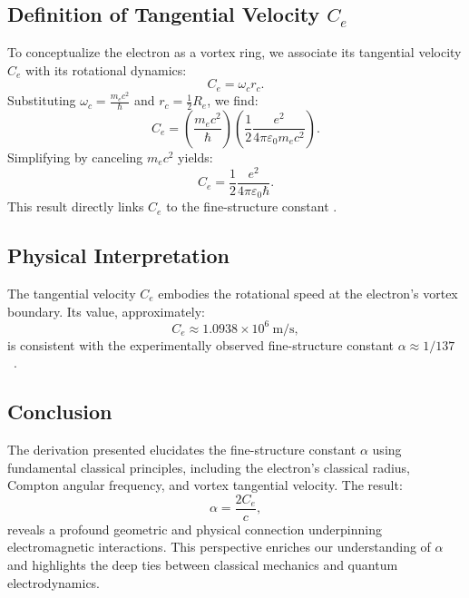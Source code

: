 \subsection*{Definition of Tangential Velocity $C_e$}
To conceptualize the electron as a vortex ring, we associate its tangential velocity $C_e$ with its rotational dynamics:
\begin{equation*}
    C_e = \omega_c r_c.
\end{equation*}
Substituting $\omega_c = \frac{m_e c^2}{\hbar}$ and $r_c = \frac{1}{2} R_e$, we find:
\begin{equation*}
    C_e = \left( \frac{m_e c^2}{\hbar} \right) \left( \frac{1}{2} \frac{e^2}{4\pi \varepsilon_0 m_e c^2} \right).
\end{equation*}
Simplifying by canceling $m_e c^2$ yields:
\begin{equation*}
    C_e = \frac{1}{2} \frac{e^2}{4\pi \varepsilon_0 \hbar}.\label{eq:C_e-from-compton}
\end{equation*}
This result directly links $C_e$ to the fine-structure constant \cite{vinen2024}.

\subsection*{Physical Interpretation}
The tangential velocity $C_e$ embodies the rotational speed at the electron's vortex boundary. Its value, approximately:
\begin{equation*}
    C_e \approx 1.0938 \times 10^6 \ \text{m/s},
\end{equation*}
is consistent with the experimentally observed fine-structure constant $\alpha \approx 1/137$~\cite{ricca1998}.

\subsection*{Conclusion}
The derivation presented elucidates the fine-structure constant $\alpha$ using fundamental classical principles, including the electron's classical radius, Compton angular frequency, and vortex tangential velocity. The result:
\begin{equation*}
    \alpha = \frac{2 C_e}{c},
\end{equation*}
reveals a profound geometric and physical connection underpinning electromagnetic interactions.
This perspective enriches our understanding of $\alpha$ and highlights the deep ties between classical mechanics and quantum electrodynamics.


